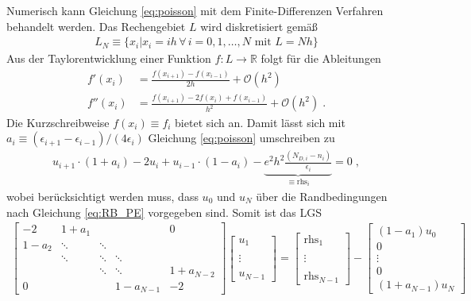 Numerisch kann Gleichung \eqref{eq:poisson} mit dem Finite-Differenzen Verfahren behandelt werden. Das Rechengebiet $L$ wird diskretisiert gemäß
\begin{align}
  L_N \equiv \{x_i | x_i = i h \,\forall\, i = 0,1,\dots,N\text{ mit }L=Nh\}
\end{align}
Aus der Taylorentwicklung einer Funktion $f:L \rightarrow \mathbb{R}$ folgt für die Ableitungen
\begin{align}
  f'(x_i) &= \frac{f(x_{i+1}) - f(x_{i-1})}{2h} + \mathcal{O}(h^2) \\
  f''(x_i) &= \frac{f(x_{i+1}) - 2f(x_i) + f(x_{i-1})}{h^2} + \mathcal{O}(h^2) \; .
\end{align}
Die Kurzschreibweise $f(x_i)\equiv f_i$ bietet sich an.
Damit lässt sich mit $a_i\equiv (\epsilon_{i+1} - \epsilon_{i-1})/(4\epsilon_i)$ Gleichung \eqref{eq:poisson} umschreiben zu
\begin{align}
  u_{i+1}\cdot(1+a_i) -2 u_i + u_{i-1}\cdot(1-a_i) - \underbrace{e^2h^2\frac{(N_{D,i} - n_i)}{\epsilon_i}}_{\equiv \text{rhs}_i} = 0\; ,
  \label{eq:discretePE}
\end{align}
wobei berücksichtigt werden muss, dass $u_0$ und $u_N$ über die Randbedingungen nach Gleichung \eqref{eq:RB_PE} vorgegeben sind. Somit ist das LGS
\begin{align}
  \left[ \begin{matrix}-2 & 1+a_1 & & & 0\\1-a_2 & \ddots & \ddots & & \\ & \ddots & \ddots & \ddots & \\& & \ddots & \ddots &  1+a_{N-2} \\0 & &  & 1-a_{N-1} & -2  \end{matrix}  \right]
  \left[ \begin{matrix}u_1             \\                          \\ \vdots                       \\                           \\u_{N-1}  \end{matrix}  \right]
  = \left[ \begin{matrix}\text{rhs}_1  \\                          \\ \vdots                       \\                         \\\text{rhs}_{N-1}  \end{matrix}  \right]
   - \left[ \begin{matrix}(1-a_1)u_0     \\0                         \\ \vdots                      \\0                        \\(1+a_{N-1})u_N  \end{matrix}  \right]
\end{align}
